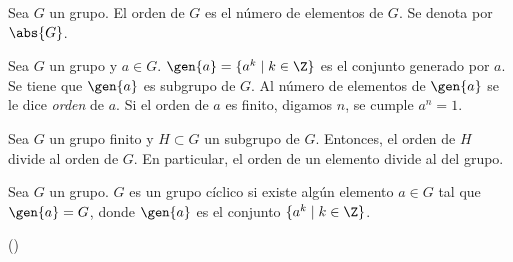\begin{TFGampliado}
        \begin{deff}{\cite[p.~36]{GruposBujalance}}
        Sea $G$ un grupo. El orden de $G$ es el número de elementos de $G$. Se denota por $\abs{G}$.
    \end{deff}
    
    \begin{deff}{\cite[p.~36]{GruposBujalance}}
        Sea $G$ un grupo y $a \in G$. $\gen{a} = \{a^k\mid k\in \Z \}$ es el conjunto generado por $a$. Se tiene que $\gen{a}$ es subgrupo de $G$. Al número de elementos de $\gen{a}$ se le dice \textit{orden} de $a$. Si el orden de $a$ es finito, digamos $n$, se cumple $a^n = 1$.
    \end{deff}
    
    \begin{prop}\cite[p.~17]{Rosenberger}
        Sea $G$ un grupo finito y $H \subset G$ un subgrupo de $G$. Entonces, el orden de $H$ divide al orden de $G$. En particular, el orden de un elemento divide al del grupo.
    \end{prop}
    
    \begin{deff}{\cite[p.~51]{GruposBujalance}}
        Sea $G$ un grupo. $G$ es un grupo cíclico si existe algún elemento $a\in G$ tal que $\gen{a} = G$, donde $\gen{a}$ es el conjunto $\{a^k\mid k\in \Z \}$.
    \end{deff}
    
    \begin{prop}(\cite[pp.~136-137]{Rosenberger})
    \end{prop}
\end{TFGampliado}



